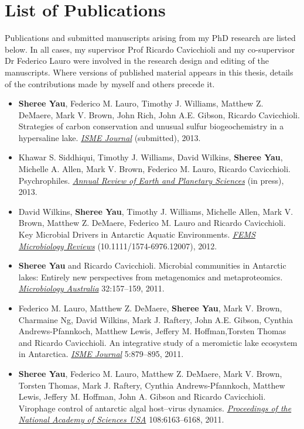 \chapter*{List of Publications}
Publications and submitted manuscripts arising from my PhD research are listed below.
In all cases, my supervisor Prof Ricardo Cavicchioli and my co-supervisor Dr Federico Lauro were
involved in the research design and editing of the manuscripts.
Where versions of published material appears in this thesis, details of the contributions made by myself and others precede it.

\begin{itemize}

\item \textbf{Sheree Yau}, Federico M. Lauro, Timothy J. Williams, Matthew Z. DeMaere, Mark V. Brown, John Rich, John A.E. Gibson, Ricardo Cavicchioli. 
Strategies of carbon conservation and unusual sulfur biogeochemistry in a hypersaline lake.
\emph{\underline{ISME Journal}}
(submitted), 2013.

\item Khawar S. Siddhiqui, Timothy J. Williams, David Wilkins, \textbf{Sheree Yau}, Michelle A. Allen, Mark V. Brown, Federico M. Lauro, Ricardo Cavicchioli.
Psychrophiles.
\emph{\underline{Annual Review of Earth and Planetary }}
\emph{\underline{Sciences}} (in press), 2013.

\item David Wilkins, \textbf{Sheree Yau}, Timothy J. Williams, Michelle Allen, Mark V. Brown, Matthew Z. DeMaere, Federico M. Lauro and Ricardo Cavicchioli.
Key Microbial Drivers in Antarctic Aquatic Environments.
\emph{\underline{FEMS Microbiology Reviews}}
(10.1111/1574-6976.12007), 2012.

\item \textbf{Sheree Yau} and Ricardo Cavicchioli. 
Microbial communities in Antarctic lakes: Entirely new perspectives from metagenomics and metaproteomics. 
\emph{\underline{Microbiology Australia}} 
32:157--159, 2011.

\item Federico M. Lauro, Matthew Z. DeMaere, \textbf{Sheree Yau}, Mark V. Brown, Charmaine Ng, David Wilkins, Mark J. Raftery, John A.E. Gibson, Cynthia Andrews-Pfannkoch, Matthew Lewis, Jeffery M. Hoffman,Torsten Thomas and Ricardo Cavicchioli. 
An integrative study of a meromictic lake ecosystem in Antarctica. 
\emph{\underline{ISME Journal}}
5:879--895, 2011.

\item \textbf{Sheree Yau}, Federico M. Lauro, Matthew Z. DeMaere, Mark V. Brown, Torsten Thomas, 
Mark J. Raftery, Cynthia Andrews-Pfannkoch, Matthew Lewis, Jeffery M. Hoffman, John A. Gibson and 
Ricardo Cavicchioli. 
Virophage control of antarctic algal host--virus dynamics. 
\emph{\underline{Proceedings of the National Academy of Sciences USA}}
108:6163--6168, 2011.

\end{itemize}

